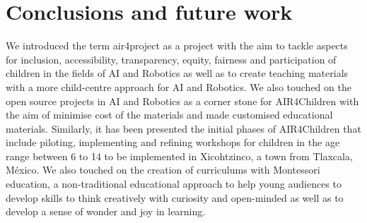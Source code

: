 \documentclass[sigconf]{acmart}
\begin{document}



\section{Conclusions and future work}
We introduced the term air4project as a project with the aim to tackle aspects for inclusion, accessibility, transparency, equity, fairness and participation of children in the fields of AI and Robotics as well as to create teaching materials with a more child-centre approach for AI and Robotics.
We also touched on the open source projects in AI and Robotics as a corner stone for AIR4Children with the aim of minimise cost of the materials and made customised educational materials.  
Similarly, it has been presented the initial phases of AIR4Children that include piloting, implementing and refining workshops for children in the age range between 6 to 14 to be implemented in Xicohtzinco, a town from Tlaxcala, M\'exico.
We also touched on the creation of curriculums with Montessori education, a non-traditional educational approach to help young audiences to develop skills to think creatively with curiosity and open-minded as well as to develop a sense of wonder and joy in learning.
\end{document}
